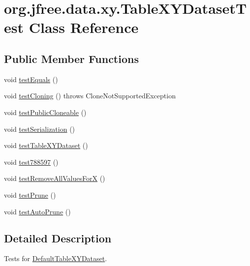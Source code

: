 \hypertarget{classorg_1_1jfree_1_1data_1_1xy_1_1_table_x_y_dataset_test}{}\section{org.\+jfree.\+data.\+xy.\+Table\+X\+Y\+Dataset\+Test Class Reference}
\label{classorg_1_1jfree_1_1data_1_1xy_1_1_table_x_y_dataset_test}
\subsection*{Public Member Functions}
\begin{DoxyCompactItemize}
\item 
void \mbox{\hyperlink{classorg_1_1jfree_1_1data_1_1xy_1_1_table_x_y_dataset_test_ad01ae70cac9614584490e777ea574bdf}{test\+Equals}} ()
\item 
void \mbox{\hyperlink{classorg_1_1jfree_1_1data_1_1xy_1_1_table_x_y_dataset_test_afe4b07331415b314a8a6749e15e46c4a}{test\+Cloning}} ()  throws Clone\+Not\+Supported\+Exception 
\item 
void \mbox{\hyperlink{classorg_1_1jfree_1_1data_1_1xy_1_1_table_x_y_dataset_test_a7b9552e0c139efc93bc105a921fa62e1}{test\+Public\+Cloneable}} ()
\item 
void \mbox{\hyperlink{classorg_1_1jfree_1_1data_1_1xy_1_1_table_x_y_dataset_test_a78175dbd1fd7982ea9b9050baeaf3744}{test\+Serialization}} ()
\item 
void \mbox{\hyperlink{classorg_1_1jfree_1_1data_1_1xy_1_1_table_x_y_dataset_test_a76c9ce4572467bebb7ae5cd5d169211a}{test\+Table\+X\+Y\+Dataset}} ()
\item 
void \mbox{\hyperlink{classorg_1_1jfree_1_1data_1_1xy_1_1_table_x_y_dataset_test_a1eedb5a7fb08e829660867ac1432b031}{test788597}} ()
\item 
void \mbox{\hyperlink{classorg_1_1jfree_1_1data_1_1xy_1_1_table_x_y_dataset_test_a5aa9c9c11c837182581f8b0ad0f9057a}{test\+Remove\+All\+Values\+ForX}} ()
\item 
void \mbox{\hyperlink{classorg_1_1jfree_1_1data_1_1xy_1_1_table_x_y_dataset_test_abd21fc90710c2739bb7fdd60bac148ba}{test\+Prune}} ()
\item 
void \mbox{\hyperlink{classorg_1_1jfree_1_1data_1_1xy_1_1_table_x_y_dataset_test_a2adbd49f5ee8dcce86dbd111c09cb1ef}{test\+Auto\+Prune}} ()
\end{DoxyCompactItemize}


\subsection{Detailed Description}
Tests for \mbox{\hyperlink{classorg_1_1jfree_1_1data_1_1xy_1_1_default_table_x_y_dataset}{Default\+Table\+X\+Y\+Dataset}}. 

